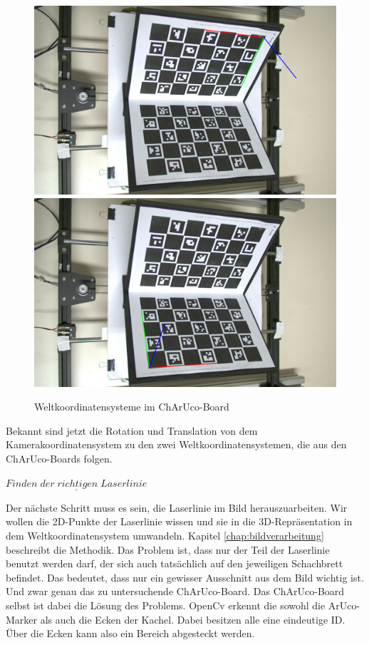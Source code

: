 		\begin{figure}[h]
			\centering
			\includegraphics[width=0.49\linewidth]{img/hauptteil/ext-calib/charuco_primary.png}
			\includegraphics[width=0.49\linewidth]{img/hauptteil/ext-calib/charuco_secondary.png}
			\caption{Weltkoordinatensysteme im ChArUco-Board}
			\label{fig:ext-calib-poses}
		\end{figure}
	
		Bekannt sind jetzt die Rotation und Translation von dem Kamerakoordinatensystem zu den zwei Weltkoordinatensystemen, die aus den ChArUco-Boards folgen.
		
		\newpage
		
		$\underline{Finden \; der \; richtigen \; Laserlinie}$
		
		Der nächste Schritt muss es sein, die Laserlinie im Bild herauszuarbeiten. Wir wollen die 2D-Punkte der Laserlinie wissen und sie in die 3D-Repräsentation in dem Weltkoordinatensystem umwandeln. Kapitel \ref{chap:bildverarbeitung} beschreibt die Methodik. Das Problem ist, dass nur der Teil der Laserlinie benutzt werden darf, der sich auch tatsächlich auf den jeweiligen Schachbrett befindet. Das bedeutet, dass nur ein gewisser Ausschnitt aus dem Bild wichtig ist. Und zwar genau das zu untersuchende ChArUco-Board. \newline
		Das ChArUco-Board selbst ist dabei die Lösung des Problems. OpenCv erkennt die sowohl die ArUco-Marker als auch die Ecken der Kachel. Dabei besitzen alle eine eindeutige ID. Über die Ecken kann also ein Bereich abgesteckt werden.
		
